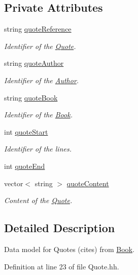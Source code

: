 \subsection*{Private Attributes}
\begin{DoxyCompactItemize}
\item 
string \hyperlink{class_quote_a9c7b2deff2ee9a0a216c360fe304202a}{quote\+Reference}
\begin{DoxyCompactList}\small\item\em Identifier of the \hyperlink{class_quote}{Quote}. \end{DoxyCompactList}\item 
string \hyperlink{class_quote_a930113c4ee0ae5e5506bbc1ea3e79b49}{quote\+Author}
\begin{DoxyCompactList}\small\item\em Identifier of the \hyperlink{class_author}{Author}. \end{DoxyCompactList}\item 
string \hyperlink{class_quote_a7e6968e086bdd45b40627a37ecbbf6fc}{quote\+Book}
\begin{DoxyCompactList}\small\item\em Identifier of the \hyperlink{class_book}{Book}. \end{DoxyCompactList}\item 
int \hyperlink{class_quote_ac426122ac24638740b2a5c5e8342e8c9}{quote\+Start}
\begin{DoxyCompactList}\small\item\em Identifier of the lines. \end{DoxyCompactList}\item 
int \hyperlink{class_quote_aa5953a477b96183c8dc2fc8a42001c29}{quote\+End}
\item 
vector$<$ string $>$ \hyperlink{class_quote_a0ffcb584920e14d7dd5c45820997f989}{quote\+Content}
\begin{DoxyCompactList}\small\item\em Content of the \hyperlink{class_quote}{Quote}. \end{DoxyCompactList}\end{DoxyCompactItemize}


\subsection{Detailed Description}
Data model for Quotes (cites) from \hyperlink{class_book}{Book}. 

Definition at line 23 of file Quote.\+hh.



